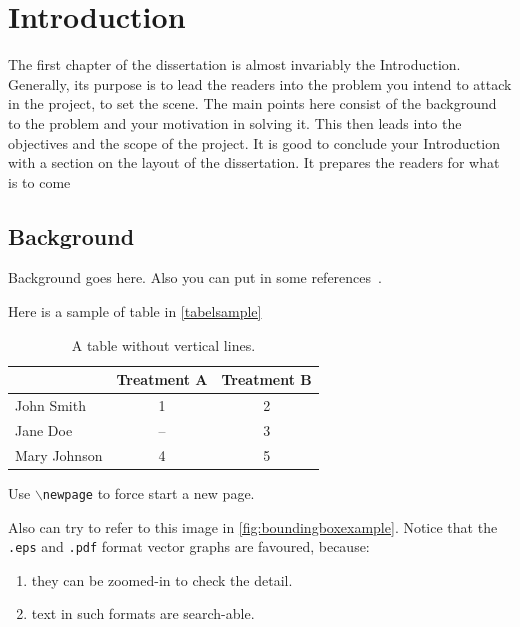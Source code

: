 
\chapter{Introduction}
\begin{spacing}{1.5}
\setlength{\parskip}{0.3in}

The first chapter of the dissertation is almost invariably the Introduction. Generally, its purpose is to lead the readers into the problem you intend to attack in the project, to set the scene. The main points here consist of the background to the problem and your motivation in solving it. This then leads into the objectives and the scope of the project. It is good to conclude your Introduction with a section on the layout of the dissertation. It prepares the readers for what is to come

\section{Background}


Background goes here. Also you can put in some references~.

Here is a sample of table in \autoref{tabelsample}

\begin{table}[ht]
\centering
\caption{A table without vertical lines.}
\label{tabelsample}
\begin{tabular}[t]{lcc}
\toprule
&Treatment A&Treatment B\\
\midrule
John Smith&1&2\\
Jane Doe&--&3\\
Mary Johnson&4&5\\
\bottomrule
\end{tabular}
\end{table}%

Use  \texttt{$\backslash$newpage} to force start a new page.

\newpage

Also can try to refer to this image in \autoref{fig:boundingboxexample}. Notice that the \texttt{.eps} and \texttt{.pdf} format vector graphs are favoured, because:

\begin{enumerate}
    \item they can be zoomed-in to check the detail.
    \item text in such formats are search-able.
\end{enumerate}



\end{spacing}
